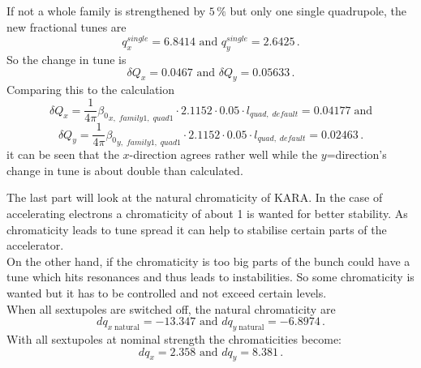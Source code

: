 \par
If not a whole family is strengthened by $5\,\%$ but only one single quadrupole, the new fractional tunes are $$q_x^{single}=6.8414\text{ and }q_y^{single}=2.6425\,.$$
So the change in tune is $$\delta Q_x=0.0467\text{ and }\delta Q_y=0.05633\,.$$
Comparing this to the calculation
$$\delta Q_x=\frac{1}{4\pi}{\beta_0}_{x,\;family1,\;quad1}\cdot 2.1152 \cdot0.05\cdot l_{quad,\;default}=0.04177\;\text{and}$$
$$\delta Q_y=\frac{1}{4\pi}{\beta_0}_{y,\;family1,\;quad1}\cdot 2.1152 \cdot0.05\cdot l_{quad,\;default}=0.02463\,.$$
it can be seen that the $x$-direction agrees rather well while the $y$=direction's change in tune is about double than calculated.
\par
The last part will look at the natural chromaticity of KARA.
In the case of accelerating electrons a chromaticity of about 1 is wanted for better stability. As chromaticity leads to tune spread it can help to stabilise certain parts of the accelerator.\\
On the other hand, if the chromaticity is too big parts of the bunch could have a tune which hits resonances and thus leads to instabilities. So some chromaticity is wanted but it has to be controlled and not exceed certain levels.\\
When all sextupoles are switched off, the natural chromaticity are
$$dq_{x\;\mathrm{natural}}=-13.347\text{ and }dq_{y\;\mathrm{natural}}=-6.8974\,.$$
With all sextupoles at nominal strength the chromaticities become:
$$dq_{x}=2.358\text{ and }dq_{y}=8.381\,.$$